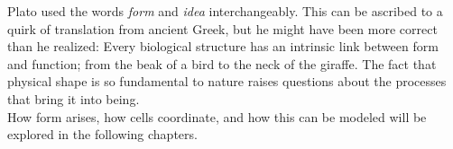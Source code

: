 Plato used the words \textit{form} and \textit{idea} interchangeably. This can be ascribed to a quirk of translation from ancient Greek, but he might have been more correct than he realized: Every biological structure has an intrinsic link between form and function; from the beak of a bird to the neck of the giraffe. The fact that physical shape is so fundamental to nature raises questions about the processes that bring it into being.\\
How form arises, how cells coordinate, and how this can be modeled will be explored in the following chapters.































